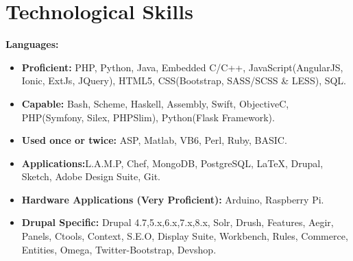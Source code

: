 \documentclass[]{friggeri-cv} %
\begin{document}
\section{Technological Skills}
\textbf{Languages:}
\begin{itemize}
\item \textbf{Proficient: }PHP, Python, Java, Embedded C/C++, JavaScript(AngularJS, Ionic, ExtJs, JQuery), HTML5, CSS(Bootstrap, SASS/SCSS \& LESS), SQL.
\item \textbf{Capable: }Bash, Scheme, Haskell, Assembly, Swift, Objective\-C, PHP(Symfony, Silex, PHPSlim), Python(Flask Framework).
\item \textbf{Used once or twice: }ASP, Matlab, VB6, Perl, Ruby, BASIC.
\item \textbf{Applications:}L.A.M.P, Chef, MongoDB, PostgreSQL, \LaTeX, Drupal, Sketch, Adobe Design Suite, Git.
\item \textbf{Hardware Applications (Very Proficient):} Arduino, Raspberry Pi.
\item \textbf{Drupal Specific: } Drupal 4.7,5.x,6.x,7.x,8.x, Solr, Drush, Features, Aegir, Panels, Ctools, Context, S.E.O, Display Suite, Workbench, Rules, Commerce, Entities, Omega, Twitter-Bootstrap, Devshop.
\end{itemize}

\end{document}

